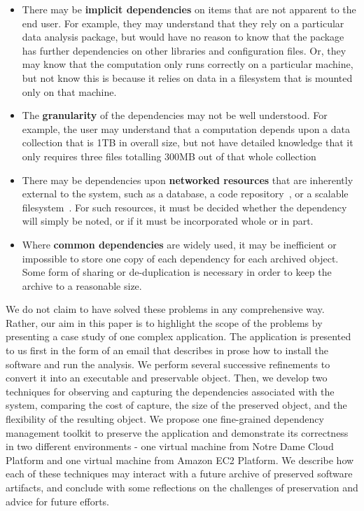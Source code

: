 \documentclass{sig-alternate}
\begin{document}
\begin{itemize}
\item There may be {\bf implicit dependencies} on items that are
not apparent to the end user.  For example, they may understand that
they rely on a particular data analysis package, but would have
no reason to know that the package has further dependencies on
other libraries and configuration files.  Or, they may know that
the computation only runs correctly on a particular machine, but
not know this is because it relies on data in a filesystem that
is mounted only on that machine.

\item The {\bf granularity} of the dependencies may not be well understood.
For example, the user may understand that a computation depends upon
a data collection that is 1TB in overall size, but not have detailed
knowledge that it only requires three files totalling 300MB out of that
whole collection

\item There may be dependencies upon {\bf networked resources} that
are inherently external to the system, such as a database, a code
repository~\cite{cms2006cmssw}, or a scalable filesystem~\cite{blomer2011cernvm}.  For such resources, it
must be decided whether the dependency will simply be noted, or if it
must be incorporated whole or in part.

\item Where {\bf common dependencies} are widely used, it may be inefficient or
impossible to store one copy of each dependency for each archived object.
Some form of sharing or de-duplication is necessary in order to keep
the archive to a reasonable size.
\end{itemize}

We do not claim to have solved these problems in any comprehensive
way.  Rather, our aim in this paper is to highlight the scope
of the problems by presenting a case study of one complex application.
The application is presented to us
first in the form of an email that describes in prose how to install
the software and run the analysis.  We perform several successive
refinements to convert it into an executable and preservable object.
Then, we develop two techniques for observing and capturing the
dependencies associated with the system, comparing the cost of capture,
the size of the preserved object, and the flexibility of the resulting
object.  
We propose one fine-grained dependency management toolkit to preserve the application and demonstrate its correctness in two different environments - one virtual machine from Notre Dame Cloud Platform and one virtual machine from Amazon EC2 Platform. 
We describe how each of these techniques may interact with
a future archive of preserved software artifacts, and conclude with
some reflections on the challenges of preservation and advice for future efforts.
\end{document}
